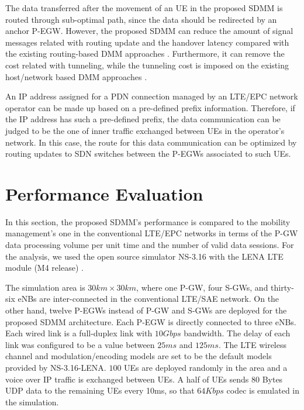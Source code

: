 \documentclass[runningheads,a4paper]{llncs}
\begin{document}
The data transferred after the movement of an UE in the proposed SDMM is routed through sub-optimal path, since the data should be redirected by an anchor P-EGW. However, the proposed SDMM can reduce the amount of signal messages related with routing update and the handover latency compared with the existing routing-based DMM approaches \cite{ref12}. Furthermore, it can remove the cost related with tunneling, while the tunneling cost is imposed on the existing host/network based DMM approaches \cite{ref7}.

An IP address assigned for a PDN connection managed by an LTE/EPC network operator can be made up based on a pre-defined prefix information. Therefore, if the IP address has such a pre-defined prefix, the data communication can be judged to be the one of inner traffic exchanged between UEs in the operator's network. In this case, the route for this data communication can be optimized by routing updates to SDN switches between the P-EGWs associated to such UEs.


\section{Performance Evaluation}

In this section, the proposed SDMM's performance is compared to the mobility management's one in the conventional LTE/EPC networks in terms of the P-GW data processing volume per unit time and the number of valid data sessions. For the analysis, we used the open source simulator NS-3.16 with the LENA LTE module (M4 release) \cite{ref13-1}.

The simulation area is $30 km \times 30 km$, where one P-GW, four S-GWs, and thirty-six eNBs are inter-connected in the conventional LTE/SAE network. On the other hand, twelve P-EGWs instead of P-GW and S-GWs are deployed for the proposed SDMM architecture. Each P-EGW is directly connected to three eNBs. Each wired link is a full-duplex link with $10 Gbps$ bandwidth. The delay of each link was configured to be a value between $25 ms$ and $125 ms$. The LTE wireless channel and modulation/encoding models are set to be the default models provided by NS-3.16-LENA. $100$ UEs are deployed randomly in the area and a voice over IP traffic is exchanged between UEs. A half of UEs sends 80 Bytes UDP data to the remaining UEs every 10ms, so that $64 Kbps$ codec is emulated in the simulation.
\end{document}
